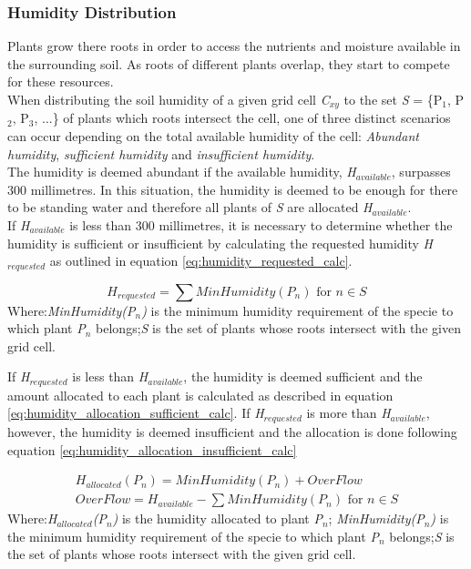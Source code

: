 \subsubsection{Humidity Distribution}

Plants grow there roots in order to access the nutrients and moisture available in the surrounding soil. As roots of different plants overlap, they start to compete for these resources.\\

When distributing the soil humidity of a given grid cell \textit{C$_{xy}$} to the set \textit{S} = \{P$_{1}$, P$_{2}$, P$_{3}$, ...\} of plants which roots intersect the cell, one of three distinct scenarios can occur depending on the total available humidity of the cell: \textit{Abundant humidity}, \textit{sufficient humidity} and \textit{insufficient humidity}.\\

The humidity is deemed abundant if the available humidity, \textit{H$_{available}$}, surpasses 300 millimetres. In this situation, the humidity is deemed to be enough for there to be standing water and therefore all plants of \textit{S} are allocated \textit{H$_{available}$}. \\

If \textit{H$_{available}$} is less than 300 millimetres, it is necessary to determine whether the humidity is sufficient or insufficient by calculating the requested humidity \textit{H$_{requested}$} as outlined in equation \ref{eq:humidity_requested_calc}. 

\begin{equation}
H_{requested} = \sum MinHumidity(P_{n}) \text{ for } n \in S
\label{eq:humidity_requested_calc}
\end{equation}
Where:\textit{MinHumidity(P$_{n}$)} is the minimum humidity requirement of the specie to which plant \textit{P$_{n}$} belongs;\textit{S} is the set of plants whose roots intersect with the given grid cell.

If \textit{H$_{requested}$} is less than \textit{H$_{available}$}, the humidity is deemed sufficient and the amount allocated to each plant is calculated as described in equation \ref{eq:humidity_allocation_sufficient_calc}. If \textit{H$_{requested}$} is more than \textit{H$_{available}$}, however, the humidity is deemed insufficient and the allocation is done following equation \ref{eq:humidity_allocation_insufficient_calc}

\begin{equation}
\begin{split}
H_{allocated}(P_{n}) = MinHumidity(P_{n}) + OverFlow \\
OverFlow = H_{available} - \sum MinHumidity(P_{n}) \text{ for } n \in S
\end{split}
\label{eq:humidity_allocation_sufficient_calc}
\end{equation}
Where:\textit{H$_{allocated}$(P$_{n}$)} is the humidity allocated to plant \textit{P$_{n}$}; \textit{MinHumidity(P$_{n}$)} is the minimum humidity requirement of the specie to which plant \textit{P$_{n}$} belongs;\textit{S} is the set of plants whose roots intersect with the given grid cell.

